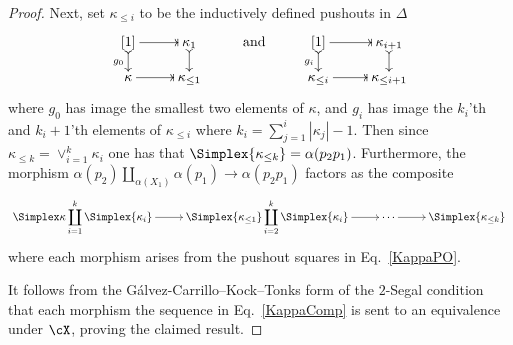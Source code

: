 \documentclass[a4paper]{article}
\numberwithin{equation}{section}
\begin{document}
\begin{proof}
Next, set $\kappa_{\leq i}$ to be the inductively defined pushouts in $\Delta$
\begin{equation}
\label{KappaPO}
 \xymatrixrowsep{.9pc} \xymatrix{[1] \ar@{->|}[r] \ar@{>->}[d]_-{g_0} & \kappa_1 \ar@{>->}[d]  & {\rm and} & [1] \ar@{->|}[r] \ar@{>->}[d]_-{g_i} & \kappa_{i+1} \ar@{>->}[d] \\
 \kappa \ar@{->|}[r] & \kappa_{\leq 1}  &  & \kappa_{\leq i} \ar@{->|}[r] & \kappa_{\leq i+1}}
\end{equation}
where $g_0$ has image the smallest two elements of $\kappa$, and $g_i$ has image the $k_i$'th and $k_i+1$'th elements of $\kappa_{\leq i}$ where $k_i = \sum_{j=1}^i |\kappa_j| -1$. Then since $\kappa_{\leq k} = \vee_{i=1}^k \kappa_i$ one has that $\Simplex{\kappa_{\leq k}} = \alpha(p_2p_1)$. Furthermore, the morphism $\alpha(p_2) \coprod_{\alpha(X_1)} \alpha(p_1) \to \alpha(p_2p_1)$ factors as the composite
\begin{equation}
\label{KappaComp}
 \xymatrixcolsep{2pc}\xymatrix{\Simplex \kappa \displaystyle \coprod_{i=1}^k \Simplex{\kappa_i}\ar[r] & \Simplex{\kappa_{\leq 1}} \displaystyle \coprod_{i=2}^k \Simplex{\kappa_i} \ar[r]  & \cdots \ar[r] & \Simplex{\kappa_{\leq k}} \,}
\end{equation}
where each morphism arises from the pushout squares in Eq.~\ref{KappaPO}.

It follows from the G\'alvez-Carrillo--Kock--Tonks form of the $2$-Segal condition that each morphism the sequence in Eq.~\ref{KappaComp} is sent to an equivalence under $\cX$, proving the claimed result.
\end{proof}





 
 
 


 
 
 
\end{document}
